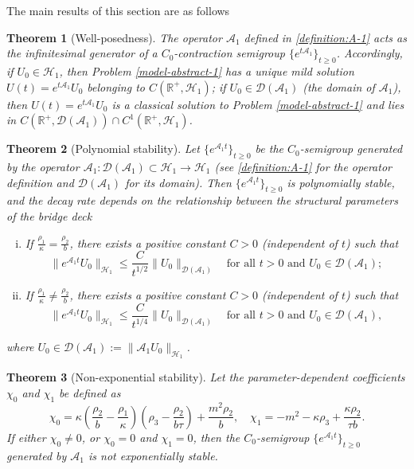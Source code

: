 \documentclass[11pt,reqno]{article}
\newtheorem{theorem}{Theorem}[section] %
\begin{document}
The main results of this section are as follows
\begin{theorem}[Well-posedness]\label{Well-Posedness-1}
	The operator $\mathcal{A}_1$ defined in \eqref{definition:A-1} acts as the infinitesimal generator of a $C_0$-contraction semigroup $\{e^{t\mathcal{A}_1}\}_{t \ge 0}$. Accordingly, if $U_0 \in \mathcal{H}_1$, then Problem \eqref{model-abstract-1} has a unique mild solution $U(t) = e^{t\mathcal{A}_1}U_0$ belonging to $C(\mathbb{R}^+, \mathcal{H}_1)$; if $U_0 \in \mathcal{D} (\mathcal{A}_1)$ (the domain of $\mathcal{A}_1$), then $U(t) = e^{t\mathcal{A}_1}U_0$ is a classical solution to Problem \eqref{model-abstract-1} and lies in $C(\mathbb{R}^+, \mathcal{D}(\mathcal{A}_1)) \cap C^1(\mathbb{R}^+, \mathcal{H}_1)$.
\end{theorem}
\begin{theorem}[Polynomial stability]\label{Polynomial stability}
   Let \(\{e^{\mathcal{A}_1 t}\}_{t \geq 0}\) be the \(C_0\)-semigroup generated by the operator \(\mathcal{A}_1: \mathcal{D}(\mathcal{A}_1) \subset \mathcal{H}_1 \to \mathcal{H}_1\) (see \eqref{definition:A-1} for the operator definition and \(\mathcal{D}(\mathcal{A}_1)\) for its domain). Then \(\{e^{\mathcal{A}_1 t}\}_{t \geq 0}\) is polynomially stable, and the decay rate depends on the relationship between the structural parameters of the bridge deck
    \begin{enumerate}[(i)]
    	\item If \(\frac{\rho_1}{\kappa} = \frac{\rho_2}{b}\), there exists a positive constant \(C > 0\) (independent of \(t\)) such that
        \[
        \|e^{\mathcal{A}_1 t} U_0\|_{\mathcal{H}_1} \leq \frac{C}{t^{1/2}} \|U_0\|_{\mathcal{D}(\mathcal{A}_1)} \quad \text{for all } t > 0 \text{ and } U_0 \in \mathcal{D}(\mathcal{A}_1);
        \]
        \item If \(\frac{\rho_1}{\kappa} \neq \frac{\rho_2}{b}\), there exists a positive constant \(C > 0\) (independent of \(t\)) such that
        \[
        \|e^{\mathcal{A}_1 t} U_0\|_{\mathcal{H}_1} \leq \frac{C}{t^{1/4}} \|U_0\|_{\mathcal{D}(\mathcal{A}_1)} \quad \text{for all } t > 0 \text{ and } U_0 \in \mathcal{D}(\mathcal{A}_1),
        \]
    \end{enumerate}
    where $U_0 \in \mathcal{D}(\mathcal{A}_1):=\|\mathcal{A}_1U_0\|_{\mathcal{H}_1}$.
  \end{theorem}
  \begin{theorem}[Non-exponential stability]\label{Non-exponential Stability}
 Let the parameter-dependent coefficients $\chi_0$ and $\chi_1$ be defined as
        \[
        \chi_0 = \kappa\left(\dfrac{\rho_2}{b} - \dfrac{\rho_1}{\kappa}\right)\left(\rho_3 - \dfrac{\rho_2}{b\tau}\right) + \dfrac{m^2 \rho_2}{b}, \quad \chi_1 = -m^2 - \kappa\rho_3 + \dfrac{\kappa\rho_2}{\tau b}.
        \]
        If either $\chi_0 \neq 0$, or $\chi_0 = 0$ and $\chi_1 = 0$, then the $C_0$-semigroup $\{e^{\mathcal{A}_1 t}\}_{t \geq 0}$ generated by $\mathcal{A}_1$ is not exponentially stable.
  \end{theorem}
\end{document}
